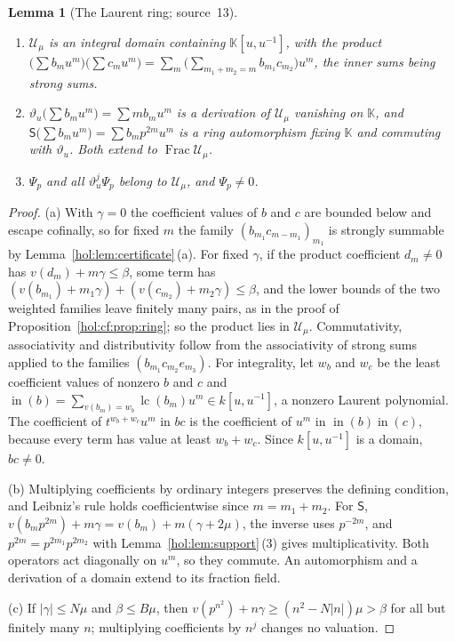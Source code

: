 \documentclass[11pt]{article}
\numberwithin{equation}{section}
\newtheorem{lemma}[theorem]{Lemma}
\theoremstyle{definition}
\theoremstyle{remark}
\newcommand{\lc}{\operatorname{lc}}
\newcommand{\abs}[1]{\lvert#1\rvert}
\newcommand{\KK}{\mathbb K}
\begin{document}
\begin{lemma}[The Laurent ring; source~13]\label{hol:td:lem:laurent}
\begin{enumerate}[label=\textup{(\alph*)}]
\item $\mathcal U_\mu$ is an integral domain containing $\KK[u,u^{-1}]$, with
the product $\bigl(\sum b_mu^m\bigr)\bigl(\sum c_mu^m\bigr)=\sum_m
\bigl(\sum_{m_1+m_2=m}b_{m_1}c_{m_2}\bigr)u^m$, the inner sums being strong
sums.
\item $\vartheta_u\bigl(\sum b_mu^m\bigr)=\sum mb_mu^m$ is a derivation of
$\mathcal U_\mu$ vanishing on $\KK$, and
$\mathsf S\bigl(\sum b_mu^m\bigr)=\sum b_mp^{2m}u^m$ is a ring automorphism
fixing $\KK$ and commuting with $\vartheta_u$. Both extend to
$\operatorname{Frac}\mathcal U_\mu$.
\item $\Psi_p$ and all $\vartheta_u^j\Psi_p$ belong to $\mathcal U_\mu$, and
$\Psi_p\ne0$.
\end{enumerate}
\end{lemma}

\begin{proof}
(a) With $\gamma=0$ the coefficient values of $b$ and $c$ are bounded below
and escape cofinally, so for fixed $m$ the family $(b_{m_1}c_{m-m_1})_{m_1}$ is
strongly summable by Lemma~\ref{hol:lem:certificate}\,(a). For fixed $\gamma$,
if the product coefficient $d_m\ne0$ has $v(d_m)+m\gamma\le\beta$, some term
has $(v(b_{m_1})+m_1\gamma)+(v(c_{m_2})+m_2\gamma)\le\beta$, and the lower
bounds of the two weighted families leave finitely many pairs, as in the proof
of Proposition~\ref{hol:cf:prop:ring}; so the product lies in $\mathcal
U_\mu$. Commutativity, associativity and distributivity follow from the
associativity of strong sums applied to the families $(b_{m_1}c_{m_2}e_{m_3})$.
For integrality, let $w_b$ and $w_c$ be the least coefficient values of
nonzero $b$ and $c$ and $\operatorname{in}(b)=\sum_{v(b_m)=w_b}\lc(b_m)u^m\in
k[u,u^{-1}]$, a nonzero Laurent polynomial. The coefficient of
$t^{w_b+w_c}u^m$ in $bc$ is the coefficient of $u^m$ in
$\operatorname{in}(b)\operatorname{in}(c)$, because every term has value at
least $w_b+w_c$. Since $k[u,u^{-1}]$ is a domain, $bc\ne0$.

(b) Multiplying coefficients by ordinary integers preserves the defining
condition, and Leibniz's rule holds coefficientwise since $m=m_1+m_2$. For
$\mathsf S$, $v(b_mp^{2m})+m\gamma=v(b_m)+m(\gamma+2\mu)$, the inverse uses
$p^{-2m}$, and $p^{2m}=p^{2m_1}p^{2m_2}$ with
Lemma~\ref{hol:lem:support}\,(3) gives multiplicativity. Both operators act
diagonally on $u^m$, so they commute. An automorphism and a derivation of a
domain extend to its fraction field.

(c) If $\abs\gamma\le N\mu$ and $\beta\le B\mu$, then
$v(p^{n^2})+n\gamma\ge(n^2-N\abs n)\mu>\beta$ for all but finitely many $n$;
multiplying coefficients by $n^j$ changes no valuation.
\end{proof}
\end{document}
